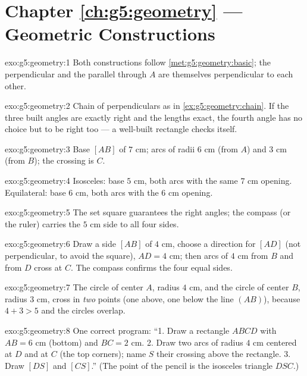 \section*{Chapter \ref{ch:g5:geometry} --- Geometric Constructions}

\begin{solution}{exo:g5:geometry:1}
Both constructions follow \cref{met:g5:geometry:basic}; the
perpendicular and the parallel through $A$ are themselves
perpendicular to each other.
\end{solution}

\begin{solution}{exo:g5:geometry:2}
Chain of perpendiculars as in \cref{ex:g5:geometry:chain}. If the
three built angles are exactly right and the lengths exact, the
fourth angle has no choice but to be right too --- a well-built
rectangle checks itself.
\end{solution}

\begin{solution}{exo:g5:geometry:3}
Base $[AB]$ of $7$ cm; arcs of radii $6$ cm (from $A$) and $3$ cm
(from $B$); the crossing is $C$.
\end{solution}

\begin{solution}{exo:g5:geometry:4}
Isosceles: base $5$ cm, both arcs with the same $7$ cm opening.
Equilateral: base $6$ cm, both arcs with the $6$ cm opening.
\end{solution}

\begin{solution}{exo:g5:geometry:5}
The set square guarantees the right angles; the compass (or the
ruler) carries the $5$ cm side to all four sides.
\end{solution}

\begin{solution}{exo:g5:geometry:6}
Draw a side $[AB]$ of $4$ cm, choose a direction for $[AD]$ (not
perpendicular, to avoid the square), $AD = 4$ cm; then arcs of
$4$ cm from $B$ and from $D$ cross at $C$. The compass confirms the
four equal sides.
\end{solution}

\begin{solution}{exo:g5:geometry:7}
The circle of center $A$, radius $4$ cm, and the circle of center
$B$, radius $3$ cm, cross in \emph{two} points (one above, one below
the line $(AB)$), because $4 + 3 > 5$ and the circles overlap.
\end{solution}

\begin{solution}{exo:g5:geometry:8}
One correct program: ``1. Draw a rectangle $ABCD$ with $AB = 6$ cm
(bottom) and $BC = 2$ cm. 2. Draw two arcs of radius $4$ cm centered
at $D$ and at $C$ (the top corners); name $S$ their crossing above
the rectangle. 3. Draw $[DS]$ and $[CS]$.'' (The point of the pencil
is the isosceles triangle $DSC$.)
\end{solution}

